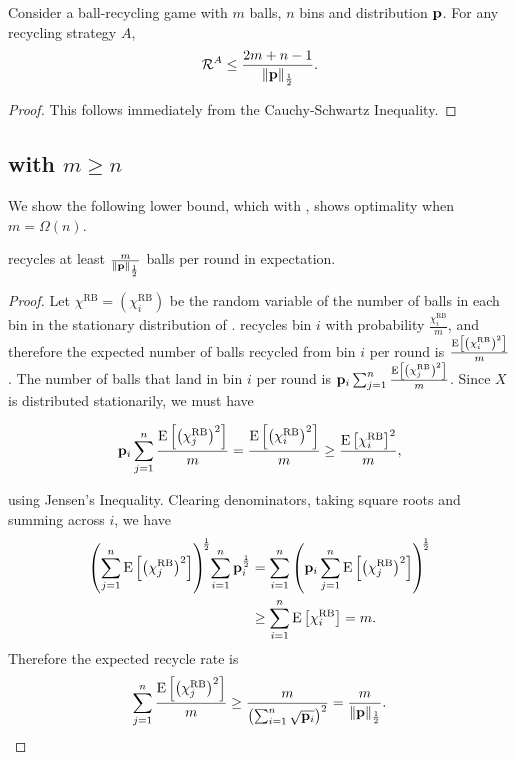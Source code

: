 \begin{lemma}\label{lem:upperbound}
	Consider a ball-recycling game with $m$ balls, $n$ bins and distribution
	$\mathbf{p}$. For any recycling strategy $A$, 
	\[\mathcal{R}^A \leq \frac{2m+n-1}{\|\mathbf{p}\|_{\frac{1}{2}}}.\]
\end{lemma}

\begin{proof}
	This follows immediately from the Cauchy-Schwartz Inequality.
\end{proof}

\subsection{\RB with \texorpdfstring{$m \geq n$}{m >= n}}\label{sec:br-randomballwithmanyballs}

We show the following lower bound, which with , shows
optimality when $m = \Omega(n)$.

\begin{lemma}\label{lem:random-ball-lower}
	\RB recycles at least $\frac{m}{\|\mathbf{p}\|_{\frac{1}{2}}}$ balls per round in
	expectation. 
\end{lemma}

\begin{proof}
	Let $\chi^\mathrm{RB}=(\chi_i^\mathrm{RB})$ be the random variable of the
	number of balls in each bin in the stationary distribution of \RB.  \RB
	recycles bin $i$ with probability $\frac{\chi_i^\mathrm{RB}}{m}$, and
	therefore the expected number of balls recycled from bin $i$ per round is
	$\frac{\mathrm{E}\left[\left(\chi_i^\mathrm{RB}\right)^2\right]}{m}$. The number of balls that
	land in bin $i$ per round is
	$\mathbf{p}_i\sum_{j=1}^n\frac{\mathrm{E}\left[\left(\chi_j^\mathrm{RB}\right)^2\right]}{m}$.  Since
	$X$ is distributed stationarily, we must have

	\begin{equation*}
		\mathbf{p}_i\sum_{j=1}^n\frac{\mathrm{E}\left[\left(\chi_j^\mathrm{RB}\right)^2\right]}{m}
	= \frac{\mathrm{E}\left[\left(\chi_i^\mathrm{RB}\right)^2\right]}{m} \geq \frac{\mathrm{E}\left[\chi_i^\mathrm{RB}\right]^2}{m},
	\end{equation*}

	using Jensen's Inequality. Clearing denominators, taking square roots and
	summing across $i$, we have
	\begin{align*}
		\left(\sum_{j=1}^n \mathrm{E}\left[\left(\chi_j^\mathrm{RB}\right)^2\right]\right)^{\hspace*{-0.5ex}\frac{1}{2}} \hspace*{-0.5ex}\sum_{i=1}^n \mathbf{p}_i^\frac{1}{2}
		&= \sum_{i=1}^n \left( \mathbf{p}_i\sum_{j=1}^n {\mathrm{E}\left[\left(\chi_j^\mathrm{RB}\right)^2\right]} \right )^{\hspace*{-0.5ex}\frac{1}{2}} \\
		&\geq \sum_{i=1}^n \mathrm{E}\left[\chi_i^\mathrm{RB}\right] = m.
	\end{align*}
	Therefore the expected recycle rate is
	\[ \sum_{j=1}^n \frac{\mathrm{E}\left[\left(\chi_j^\mathrm{RB}\right)^2\right]}{m}
	\geq \frac{m}{\left(\sum_{i=1}^n \sqrt{\mathbf{p}_i}\right)^2}
	= \frac{m}{\|\mathbf{p}\|_{\frac{1}{2}}}. \]
\end{proof}

